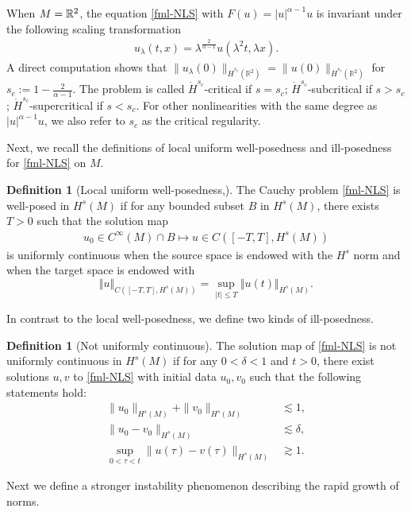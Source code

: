 \documentclass[11pt, reqno]{amsart}
\numberwithin{equation}{section}
\newcommand{\R}{\Bbb R}
\theoremstyle{definition}
\newtheorem{definition}[theorem]{Definition}
\theoremstyle{remark}
\begin{document}
When $M=\R^2$, the equation \eqref{fml-NLS} with $F(u)=|u|^{\alpha-1}u$ is invariant under the following scaling transformation
\begin{align*}
u_\lambda(t,x)=\lambda^\frac{2}{\alpha-1}u(\lambda^2t,\lambda x).
\end{align*}
A direct computation shows that $\|u_\lambda(0)\|_{\dot H^{s_c}(\mathbb{R}^2)} = \|u(0)\|_{\dot H^{s_c}(\mathbb{R}^2)}$ for $s_c := 1 - \frac{2}{\alpha-1}$. The problem is called $\dot H^{s_c}$-critical if $s=s_c$;  $\dot H^{s_c}$-subcritical if $s>s_c$;  $\dot H^{s_c}$-supercritical if $s<s_c$. For other nonlinearities with the same degree as $|u|^{\alpha-1}u$, we also refer  to $s_c$ as the critical regularity. 	
	
Next, we recall the definitions of local uniform well-posedness and ill-posedness for \eqref{fml-NLS} on $M$.
\begin{definition}[Local uniform well-posedness,\cite{CCT-03}]\label{def-well-pose}
The Cauchy problem \eqref{fml-NLS} is  well-posed in $H^s(M)$ if for any bounded subset $B$ in $H^s(M)$, there exists $T>0$ such that the solution map
\begin{align*}
u_0\in C^\infty(M)\cap B\mapsto u\in C(\left[-T,T\right],H^s(M))
\end{align*} 
is uniformly continuous when the source space is endowed with the $H^s$ norm and when the target space is endowed with
\begin{equation*}
\Vert u\Vert_{C(\left[-T,T\right],H^s(M))}=\sup_{\left|t\right|\leqslant T}\Vert u(t)\Vert_{H^s(M)}.
\end{equation*} 
\end{definition}
In contrast to the local well-posedness, we define two kinds of ill-posedness.
\begin{definition}[Not uniformly continuous]\label{def-ill-pose-weak}
The solution map of \eqref{fml-NLS} is not uniformly continuous in $H^s(M)$ if for any $0<\delta<1$ and $t>0$, there exist solutions $u,v$ to \eqref{fml-NLS} with initial data $u_0,v_0$ such that the following statements hold:
\begin{equation*}
\begin{aligned}
\|u_0\|_{H^s(M)} + \|v_0\|_{H^s(M)} &\lesssim 1,\\
\|u_0-v_0\|_{H^s(M)} &\lesssim \delta,\\
\sup_{0<\tau<t}\|u(\tau)-v(\tau)\|_{H^s(M)} &\gtrsim 1.
\end{aligned}
\end{equation*} 
\end{definition}
Next we define a stronger instability phenomenon describing  the rapid growth of norms.
\end{document}
